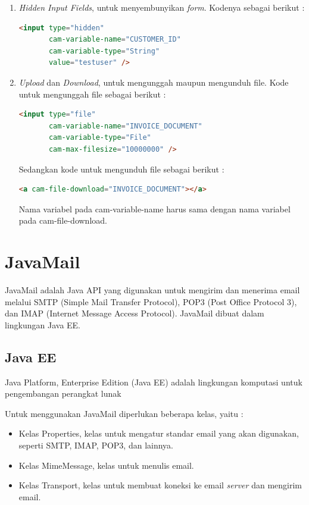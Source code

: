 \begin{enumerate}
	\item \textit{Hidden Input Fields}, untuk menyembunyikan \textit{form}. Kodenya sebagai berikut :
	\begin{lstlisting}[language=html,basicstyle=\tiny,caption=Hidden Input Fields]
	<input type="hidden"
       cam-variable-name="CUSTOMER_ID"
       cam-variable-type="String"
       value="testuser" />
	\end{lstlisting}
	
	\item \textit{Upload} dan \textit{Download}, untuk mengunggah maupun mengunduh file. Kode untuk mengunggah file sebagai berikut :
		\begin{lstlisting}[language=html,basicstyle=\tiny,caption=Upload]
	<input type="file"
       cam-variable-name="INVOICE_DOCUMENT"
       cam-variable-type="File"
       cam-max-filesize="10000000" />
	\end{lstlisting}
Sedangkan kode untuk mengunduh file sebagai berikut :
\begin{lstlisting}[language=html,basicstyle=\tiny,caption=Download]
<a cam-file-download="INVOICE_DOCUMENT"></a>
\end{lstlisting}

Nama variabel pada cam-variable-name harus sama dengan nama variabel pada cam-file-download.

	\end{enumerate}








	



\section{JavaMail}
\label{javamail}
JavaMail adalah Java API yang digunakan untuk mengirim dan menerima email melalui SMTP (Simple Mail Transfer Protocol), POP3 (Post Office Protocol 3), dan IMAP (Internet Message Access Protocol)\cite{javamail}. JavaMail dibuat dalam lingkungan Java EE.  
\subsection{Java EE}
Java Platform, Enterprise Edition (Java EE) adalah lingkungan komputasi untuk pengembangan perangkat lunak 


Untuk menggunakan JavaMail diperlukan beberapa kelas, yaitu :
\begin{itemize}
	\item Kelas Properties, kelas untuk mengatur standar email yang akan digunakan, seperti SMTP, IMAP, POP3, dan lainnya.
	\item Kelas MimeMessage, kelas untuk menulis email.
	\item Kelas Transport, kelas untuk membuat koneksi ke email \textit{server} dan mengirim email.
\end{itemize}

